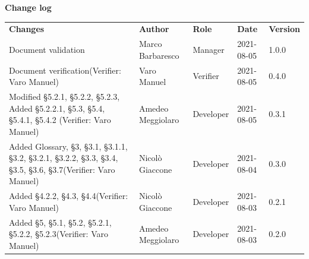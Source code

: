 \documentclass[a4paper]{article}
\begin{document}
\begin{center}
    \textbf{\Large Change log}\\
    \vspace{10px}
    \begin{table}[h!]
        \centering
        \renewcommand{\arraystretch}{1.8}
        \begin{tabular}{p{150px} p{90px} p{80px} p{60px} p{45px}}
            \rowcolor{logo!70} \textbf{Changes}                                                                                                                  & \textbf{Author}   & \textbf{Role} & \textbf{Date} & \textbf{Version} \\
            Document validation                                                                                                                                  & Marco Barbaresco  & Manager       & 2021-08-05    & 1.0.0            \\
            Document verification\newline(Verifier: Varo Manuel)                                                                                                 & Varo Manuel       & Verifier      & 2021-08-05    & 0.4.0            \\
            Modified \S{5.2.1}, \S{5.2.2}, \S{5.2.3}, Added \S{5.2.2.1}, \S{5.3}, \S{5.4}, \S{5.4.1}, \S{5.4.2} \newline(Verifier: Varo Manuel)                  & Amedeo Meggiolaro & Developer     & 2021-08-05    & 0.3.1            \\
            Added Glossary, \S{3}, \S{3.1}, \S{3.1.1}, \S{3.2}, \S{3.2.1}, \S{3.2.2}, \S{3.3}, \S{3.4}, \S{3.5}, \S{3.6}, \S{3.7}\newline(Verifier: Varo Manuel) & Nicolò Giaccone   & Developer     & 2021-08-04    & 0.3.0            \\
            Added \S{4.2.2}, \S{4.3}, \S{4.4}\newline(Verifier: Varo Manuel)                                                                                     & Nicolò Giaccone   & Developer     & 2021-08-03    & 0.2.1            \\
            Added \S{5}, \S{5.1}, \S{5.2}, \S{5.2.1}, \S{5.2.2}, \S{5.2.3}\newline(Verifier: Varo Manuel)                                                        & Amedeo Meggiolaro & Developer     & 2021-08-03    & 0.2.0            \\

\end{tabular}
\end{table}
\end{center}
\end{document}
